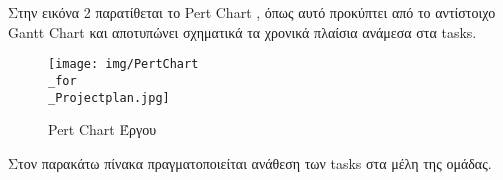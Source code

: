 \documentclass{../ol-softwaremanual}
\begin{document}
	
	\newpage 
	
	\flushleft
	Στην εικόνα 2 παρατίθεται το \en Pert Chart \gr, όπως αυτό προκύπτει από το αντίστοιχο \en Gantt Chart \gr και αποτυπώνει σχηματικά τα χρονικά πλαίσια ανάμεσα στα \en tasks.\gr
	
	
	\begin{figure}[htbp!]
		
		\texttt{[image: img/PertChart\\\_for\\\_Projectplan.jpg]}
		\caption{ \en Pert Chart \gr Έργου}
	\end{figure}
	
	\newpage
	
	\vspace{20pt}
	\flushleft
	Στον παρακάτω πίνακα πραγματοποιείται ανάθεση των \en tasks \gr στα μέλη της ομάδας.		
	
\end{document}
